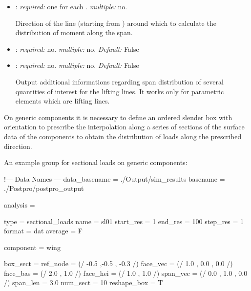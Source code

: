 \begin{itemize}
\item {}: \textit{required:} one for each . 
\textit{multiple:} no.

Direction of the line (starting from ) around which to calculate 
the distribution of moment along the span.

\item {}: \textit{required:} no. \textit{multiple:} no. 
\textit{Default:} False

\item {}: \textit{required:} no. \textit{multiple:} no. 
\textit{Default:} False

Output additional informations regarding span distribution of several quantities 
of interest for the lifting lines. It works only for parametric elements which 
are lifting lines.

\end{itemize}

On generic components it is necessary to define an ordered slender box with 
orientation to prescribe the interpolation along a series of sections of the 
surface data of the components to obtain the distribution of loads along the 
prescribed direction.

An example  group for sectional loads on generic components:

\begin{inputfile}[frame=single, caption={dust\_post.in for sectional load on 
  generic components}, label={file:dust_post.in_sectional_param}]
!--- Data Names ---
data_basename = ./Output/sim_results
basename =     ./Postpro/postpro_output

analysis = {

type = sectional_loads
name = sl01
start_res = 1
end_res   = 100 
step_res  = 1
format = dat
average = F

component = wing

box_sect = {
 ref_node = (/ -0.5 ,-0.5 , -0.3 /)
 face_vec = (/ 1.0 , 0.0 , 0.0 /)
 face_bas = (/ 2.0 , 1.0 /) 
 face_hei = (/ 1.0 , 1.0 /)
 span_vec = (/ 0.0 , 1.0 , 0.0 /)
 span_len = 3.0
 num_sect = 10
 reshape_box = T 
} 


}
\end{inputfile}

